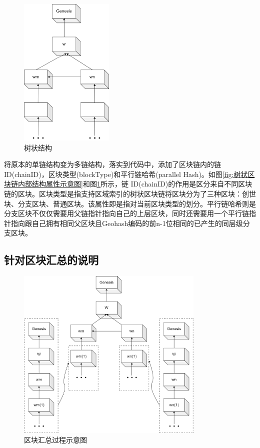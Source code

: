\begin{figure}
	\centering
	\includegraphics[width=0.4\textwidth]{figures/多链结构.png}
	\caption{树状结构}
	\label{fig:树状结构}
\end{figure}

将原本的单链结构变为多链结构，落实到代码中，添加了区块链内的链ID(chainID)，区块类型(blockType)和平行链哈希(parallel Hash)。如图\ref{fig:树状区块链内部结构属性示意图}和图\ref{fig:树状结构}所示，链 ID(chainID)的作用是区分来自不同区块链的区块。区块类型是指支持区域索引的树状区块链将区块分为了三种区块：创世块、分支区块、普通区块。该属性即是指对当前区块类型的划分。平行链哈希则是分支区块不仅仅需要用父链指针指向自己的上层区块，同时还需要用一个平行链指针指向跟自己拥有相同父区块且Geohash编码的前n-1位相同的已产生的同层级分支区块。

\subsection{针对区块汇总的说明}

\begin{figure}
	\centering
	\includegraphics[width=0.8\textwidth]{figures/区块汇总过程示意图.png}
	\caption{区块汇总过程示意图}
	\label{fig:区块汇总过程示意图}
\end{figure}


